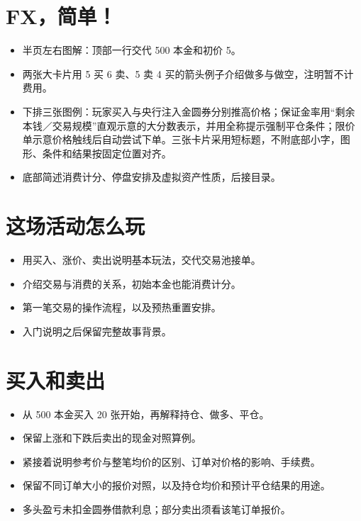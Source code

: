 
\section*{FX，简单！}
\begin{itemize}
  \item 半页左右图解：顶部一行交代 500 本金和初价 5。
  \item 两张大卡片用 5 买 6 卖、5 卖 4 买的箭头例子介绍做多与做空，注明暂不计费用。
  \item 下排三张图例：玩家买入与央行注入金圆券分别推高价格；保证金率用“剩余本钱／交易规模”直观示意的大分数表示，并用全称提示强制平仓条件；限价单示意价格触线后自动尝试下单。三张卡片采用短标题，不附底部小字，图形、条件和结果按固定位置对齐。
  \item 底部简述消费计分、停盘安排及虚拟资产性质，后接目录。
\end{itemize}

\section{这场活动怎么玩}
\begin{itemize}
  \item 用买入、涨价、卖出说明基本玩法，交代交易池接单。
  \item 介绍交易与消费的关系，初始本金也能消费计分。
  \item 第一笔交易的操作流程，以及预热重置安排。
  \item 入门说明之后保留完整故事背景。
\end{itemize}

\section{买入和卖出}
\begin{itemize}
  \item 从 500 本金买入 20 张开始，再解释持仓、做多、平仓。
  \item 保留上涨和下跌后卖出的现金对照算例。
  \item 紧接着说明参考价与整笔均价的区别、订单对价格的影响、手续费。
  \item 保留不同订单大小的报价对照，以及持仓均价和预计平仓结果的用途。
  \item 多头盈亏未扣金圆券借款利息；部分卖出须看该笔订单报价。
\end{itemize}

